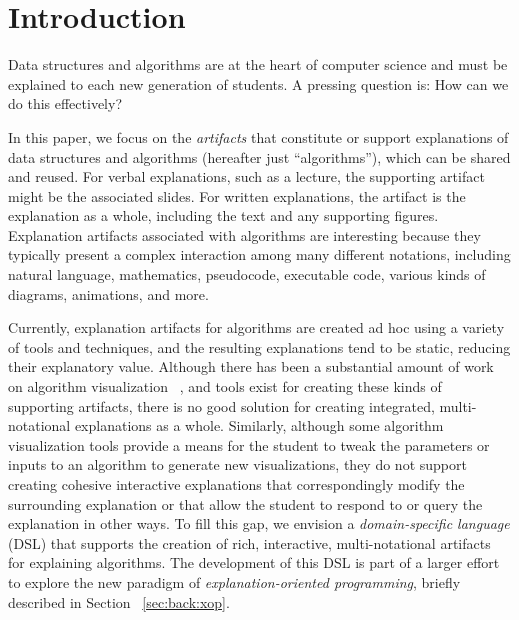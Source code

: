 \documentclass[sigconf]{acmart}
\begin{document}
\maketitle

\section{Introduction}
\label{sec:intro}

Data structures and algorithms are at the heart of computer science and must be
explained to each new generation of students. A pressing question is: How can we
do this effectively?

In this paper, we focus on the \emph{artifacts} that constitute or support
explanations of data structures and algorithms (hereafter just ``algorithms''),
which can be shared and reused.
%
For verbal explanations, such as a lecture, the supporting artifact might be
the associated slides. For written explanations, the artifact is the
explanation as a whole, including the text and any supporting figures.
%
Explanation artifacts associated with algorithms are interesting because they
typically present a complex interaction among many different notations,
including natural language, mathematics, pseudocode, executable code, various
kinds of diagrams, animations, and more.


Currently, explanation artifacts for algorithms are created ad hoc using a
variety of tools and techniques, and the resulting explanations tend to be
static, reducing their explanatory value.
%
Although there has been a substantial amount of work on algorithm visualization~
\cite{Gloor92,Gloor97,HDS02, shaffer2010algorithm, HANSEN2002291, KANN1997223},
and tools exist for creating these kinds of supporting artifacts, there is no
good solution for creating integrated, multi-notational explanations as a whole.
Similarly, although some algorithm visualization tools provide a means for the
student to tweak the parameters or inputs to an algorithm to generate new
visualizations, they do not support creating cohesive interactive explanations
that correspondingly modify the surrounding explanation or that allow the
student to respond to or query the explanation in other ways.
%
To fill this gap, we envision a \emph{domain-specific language} (DSL) that
supports the creation of rich, interactive, multi-notational artifacts for
explaining algorithms.
%
The development of this DSL is part of a larger effort to explore the new
paradigm of \emph{explanation-oriented programming}, briefly described in
Section~ \ref{sec:back:xop}.
\end{document}
